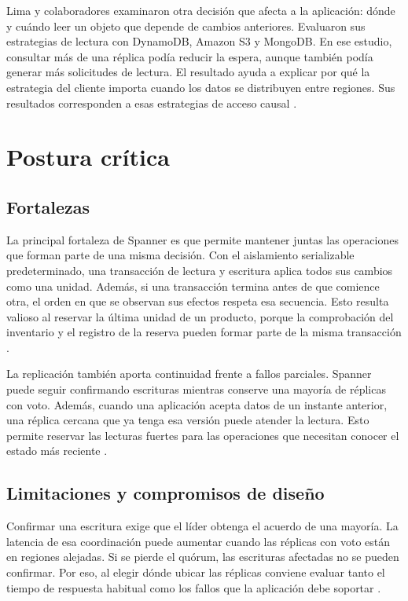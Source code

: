\documentclass[11pt,a4paper]{article}
\begin{document}
Lima y colaboradores examinaron otra decisión que afecta a la aplicación: dónde y cuándo leer un objeto que depende de cambios anteriores. Evaluaron sus estrategias de lectura con DynamoDB, Amazon S3 y MongoDB. En ese estudio, consultar más de una réplica podía reducir la espera, aunque también podía generar más solicitudes de lectura. El resultado ayuda a explicar por qué la estrategia del cliente importa cuando los datos se distribuyen entre regiones. Sus resultados corresponden a esas estrategias de acceso causal \cite{LimaEtAl2023CausalAccess}.

\section{Postura crítica}
\subsection{Fortalezas}
La principal fortaleza de Spanner es que permite mantener juntas las operaciones que forman parte de una misma decisión. Con el aislamiento serializable predeterminado, una transacción de lectura y escritura aplica todos sus cambios como una unidad. Además, si una transacción termina antes de que comience otra, el orden en que se observan sus efectos respeta esa secuencia. Esto resulta valioso al reservar la última unidad de un producto, porque la comprobación del inventario y el registro de la reserva pueden formar parte de la misma transacción \cite{GoogleSpannerTransactions}.

La replicación también aporta continuidad frente a fallos parciales. Spanner puede seguir confirmando escrituras mientras conserve una mayoría de réplicas con voto. Además, cuando una aplicación acepta datos de un instante anterior, una réplica cercana que ya tenga esa versión puede atender la lectura. Esto permite reservar las lecturas fuertes para las operaciones que necesitan conocer el estado más reciente \cite{GoogleSpannerReplication}.

\subsection{Limitaciones y compromisos de diseño}
Confirmar una escritura exige que el líder obtenga el acuerdo de una mayoría. La latencia de esa coordinación puede aumentar cuando las réplicas con voto están en regiones alejadas. Si se pierde el quórum, las escrituras afectadas no se pueden confirmar. Por eso, al elegir dónde ubicar las réplicas conviene evaluar tanto el tiempo de respuesta habitual como los fallos que la aplicación debe soportar \cite{GoogleSpannerReplication}.
\end{document}
